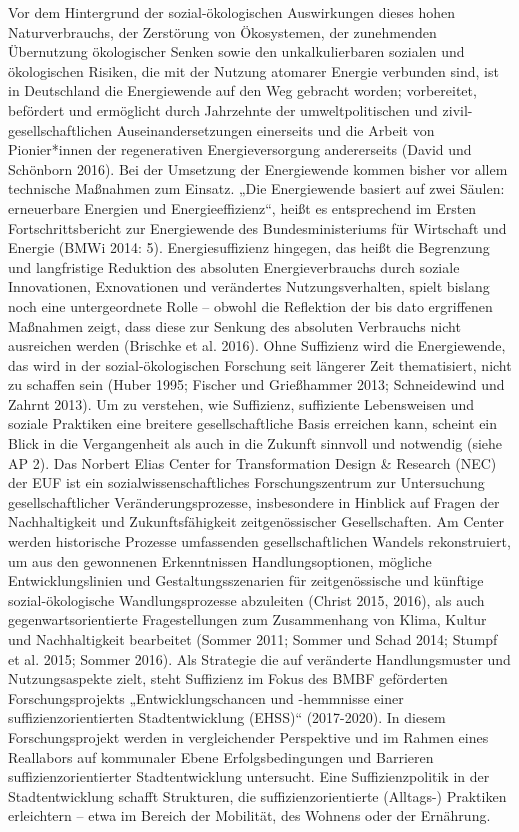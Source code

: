 \documentclass[a4paper,11pt,twoside]{scrartcl}
\begin{document}
Vor dem Hintergrund der sozial-ökologischen Auswirkungen dieses hohen Naturverbrauchs, der Zerstörung von Ökosystemen, der zunehmenden Übernutzung ökologischer Senken sowie den unkalkulierbaren sozialen und ökologischen Risiken, die mit der Nutzung atomarer Energie verbunden sind, ist in Deutschland die Energiewende auf den Weg gebracht worden; vorbereitet, befördert und ermöglicht durch Jahrzehnte der umweltpolitischen und zivil-gesellschaftlichen Auseinandersetzungen einerseits und die Arbeit von Pionier*innen der regenerativen Energieversorgung andererseits (David und Schönborn 2016). Bei der Umsetzung der Energiewende kommen bisher vor allem technische Maßnahmen zum Einsatz. „Die Energiewende basiert auf zwei Säulen: erneuerbare Energien und Energieeffizienz“, heißt es entsprechend im Ersten Fortschrittsbericht zur Energiewende des Bundesministeriums für Wirtschaft und Energie (BMWi 2014: 5). Energiesuffizienz hingegen, das heißt die Begrenzung und langfristige Reduktion des absoluten Energieverbrauchs durch soziale Innovationen, Exnovationen und verändertes Nutzungsverhalten, spielt bislang noch eine untergeordnete Rolle – obwohl die Reflektion der bis dato ergriffenen Maßnahmen zeigt, dass diese zur Senkung des absoluten Verbrauchs nicht ausreichen werden (Brischke et al. 2016). Ohne Suffizienz wird die Energiewende, das wird in der sozial-ökologischen Forschung seit längerer Zeit thematisiert, nicht zu schaffen sein (Huber 1995; Fischer und Grießhammer 2013; Schneidewind und Zahrnt 2013). Um zu verstehen, wie Suffizienz, suffiziente Lebensweisen und soziale Praktiken eine breitere gesellschaftliche Basis erreichen kann, scheint ein Blick in die Vergangenheit als auch in die Zukunft sinnvoll und notwendig (siehe AP 2).
Das Norbert Elias Center for Transformation Design & Research (NEC) der EUF ist ein sozialwissenschaftliches Forschungszentrum zur Untersuchung gesellschaftlicher Veränderungsprozesse, insbesondere in Hinblick auf Fragen der Nachhaltigkeit und Zukunftsfähigkeit zeitgenössischer Gesellschaften. Am Center werden historische Prozesse umfassenden gesellschaftlichen Wandels rekonstruiert, um aus den gewonnenen Erkenntnissen Handlungsoptionen, mögliche Entwicklungslinien und Gestaltungsszenarien für zeitgenössische und künftige sozial-ökologische Wandlungsprozesse abzuleiten (Christ 2015, 2016), als auch gegenwartsorientierte Fragestellungen zum Zusammenhang von Klima, Kultur und Nachhaltigkeit bearbeitet (Sommer 2011; Sommer und Schad 2014; Stumpf et al. 2015; Sommer 2016).
Als Strategie die auf veränderte Handlungsmuster und Nutzungsaspekte zielt, steht Suffizienz im Fokus des BMBF geförderten Forschungsprojekts „Entwicklungschancen und -hemmnisse einer suffizienzorientierten Stadtentwicklung (EHSS)“ (2017-2020). In diesem Forschungsprojekt werden in vergleichender Perspektive und im Rahmen eines Reallabors auf kommunaler Ebene Erfolgsbedingungen und Barrieren suffizienzorientierter Stadtentwicklung untersucht. Eine Suffizienzpolitik in der Stadtentwicklung schafft Strukturen, die suffizienzorientierte (Alltags-) Praktiken erleichtern – etwa im Bereich der Mobilität, des Wohnens oder der Ernährung.
\end{document}
